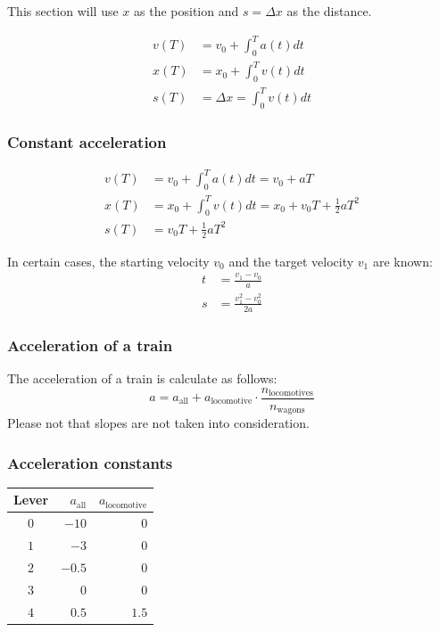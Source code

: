 \documentclass[notitlepage]{article}
\begin{document}
This section will use $x$ as the position and \( s = \Delta x \) as the distance.

\begin{align*}
  v(T) &= v_0 + \int_0^T a(t) dt \\
  x(T) &= x_0 + \int_0^T v(t) dt \\
  s(T) &= \Delta x = \int_0^T v(t) dt
\end{align*}

\subsubsection{Constant acceleration}
\begin{align*}
  v(T) &= v_0 + \int_0^T a(t)dt = v_0 + aT \\
  x(T) &= x_0 + \int_0^T v(t)dt = x_0 + v_0T + \frac{1}{2}aT^2 \\
  s(T) &= v_0T + \frac{1}{2}aT^2
\end{align*}

In certain cases, the starting velocity $v_0$ and the target velocity $v_1$ are known:
\begin{align*}
  t &= \frac{v_1 - v_0}{a} \\
  s &= \frac{v_1^2 - v_0^2}{2a}
\end{align*}

\subsubsection{Acceleration of a train}
The acceleration of a train is calculate as follows:
\[a = a_{\text{all}} + a_{\text{locomotive}}\cdot\frac{n_{\text{locomotives}}}{n_{\text{wagons}}}\]
Please not that slopes are not taken into consideration.

\subsubsection{Acceleration constants}
\begin{tabular}{|c|r|r|}
  \hline
  Lever & $a_{\text{all}}$ & $a_{\text{locomotive}}$ \\
  \hline
  $0$ & $-10$ & $0$ \\
  $1$ & $-3$ & $0$ \\
  $2$ & $-0.5$ & $0$ \\
  $3$ & $0$ & $0$ \\
  $4$ & $0.5$ & $1.5$ \\
  \hline
\end{tabular}

\ifx\HCode\undefined
\printindex
\fi
\end{document}
